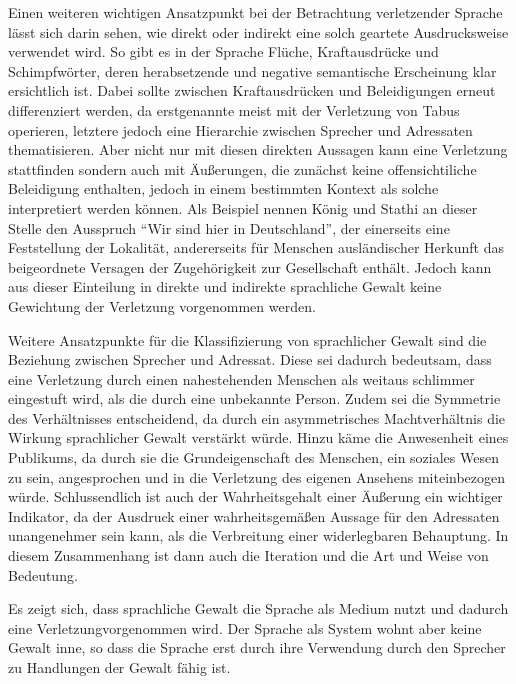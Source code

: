 Einen weiteren wichtigen Ansatzpunkt bei der Betrachtung verletzender Sprache lässt sich darin sehen, wie direkt oder indirekt eine solch geartete Ausdrucksweise verwendet wird.
So gibt es in der Sprache Flüche, Kraftausdrücke und Schimpfwörter, deren herabsetzende und negative semantische Erscheinung klar ersichtlich ist.
Dabei sollte zwischen Kraftausdrücken und Beleidigungen erneut differenziert werden, da erstgenannte meist mit der Verletzung von Tabus operieren, letztere jedoch eine Hierarchie zwischen Sprecher und Adressaten thematisieren.
Aber nicht nur mit diesen direkten Aussagen kann eine Verletzung stattfinden sondern auch mit Äußerungen, die zunächst keine offensichtiliche Beleidigung enthalten, jedoch in einem bestimmten Kontext als solche interpretiert werden können.
Als Beispiel nennen König und Stathi an dieser Stelle den Ausspruch "`Wir sind hier in Deutschland"', der einerseits eine Feststellung der Lokalität, andererseits für Menschen ausländischer Herkunft das beigeordnete Versagen der Zugehörigkeit zur Gesellschaft enthält.
Jedoch kann aus dieser Einteilung in direkte und indirekte sprachliche Gewalt keine Gewichtung der Verletzung vorgenommen werden.

Weitere Ansatzpunkte für die Klassifizierung von sprachlicher Gewalt sind die Beziehung zwischen Sprecher und Adressat.
Diese sei dadurch bedeutsam, dass eine Verletzung durch einen nahestehenden Menschen als weitaus schlimmer eingestuft wird, als die durch eine unbekannte Person.
Zudem sei die Symmetrie des Verhältnisses entscheidend, da durch ein asymmetrisches Machtverhältnis die Wirkung sprachlicher Gewalt verstärkt würde.
Hinzu käme die Anwesenheit eines Publikums, da durch sie die Grundeigenschaft des Menschen, ein soziales Wesen zu sein, angesprochen und in die Verletzung des eigenen Ansehens miteinbezogen würde.
Schlussendlich ist auch der Wahrheitsgehalt einer Äußerung ein wichtiger Indikator, da der Ausdruck einer wahrheitsgemäßen Aussage für den Adressaten unangenehmer sein kann, als die Verbreitung einer widerlegbaren Behauptung.
In diesem Zusammenhang ist dann auch die Iteration und die Art und Weise von Bedeutung.

Es zeigt sich, dass sprachliche Gewalt die Sprache als Medium nutzt und dadurch eine Verletzungvorgenommen wird. Der Sprache als System wohnt aber keine Gewalt inne, so dass die Sprache erst durch ihre Verwendung durch den Sprecher zu Handlungen der Gewalt fähig ist.

